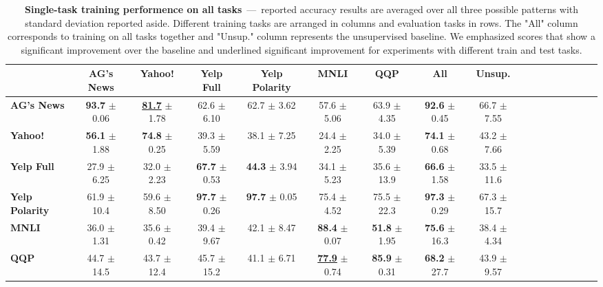 \begin{table*}[h]
	\centering
	\fontsize{9}{13}
	\selectfont
	\begin{tabular*}{\textwidth}{l@{\extracolsep{\fill}}cccccccccccccccc}
		\toprule
		& \textbf{AG's News}    & \textbf{Yahoo!}    & \textbf{Yelp Full}    & \textbf{Yelp Polarity}    & \textbf{MNLI}    & \textbf{QQP}    & \textbf{All}    & \textbf{Unsup.}    \\ \hline
		\textbf{AG's News}        & \textbf{93.7}   \tiny$\pm$ 0.06      & \textbf{\underline{81.7}}   \tiny$\pm$ 1.78      & 62.6      \tiny$\pm$ 6.10      & 62.7          \tiny$\pm$ 3.62      & 57.6 \tiny$\pm$ 5.06      & 63.9 \tiny$\pm$ 4.35      & \textbf{92.6} \tiny$\pm$ 0.45      & 66.7   \tiny$\pm$ 7.55      \\
		\textbf{Yahoo!}         & \textbf{56.1}    \tiny$\pm$ 1.88      & \textbf{74.8}   \tiny$\pm$ 0.25      & 39.3       \tiny$\pm$ 5.59      & 38.1           \tiny$\pm$ 7.25      & 24.4  \tiny$\pm$ 2.25      & 34.0 \tiny$\pm$ 5.39      & \textbf{74.1} \tiny$\pm$ 0.68      & 43.2   \tiny$\pm$ 7.66      \\
		\textbf{Yelp Full}     & 27.9    \tiny$\pm$ 6.25      & 32.0   \tiny$\pm$ 2.23      & \textbf{67.7}       \tiny$\pm$ 0.53      & \textbf{44.3}           \tiny$\pm$ 3.94      & 34.1  \tiny$\pm$ 5.23      & 35.6 \tiny$\pm$ 13.9      & \textbf{66.6} \tiny$\pm$ 1.58      & 33.5   \tiny$\pm$ 11.6      \\
		\textbf{Yelp Polarity} & 61.9    \tiny$\pm$ 10.4      & 59.6   \tiny$\pm$ 8.50      & \textbf{97.7}       \tiny$\pm$ 0.26      & \textbf{97.7}           \tiny$\pm$ 0.05      & 75.4  \tiny$\pm$ 4.52      & 75.5 \tiny$\pm$ 22.3      & \textbf{97.3} \tiny$\pm$ 0.29      & 67.3   \tiny$\pm$ 15.7      \\
		\textbf{MNLI}          & 36.0    \tiny$\pm$ 1.31      & 35.6   \tiny$\pm$ 0.42      & 39.4       \tiny$\pm$ 9.67      & 42.1           \tiny$\pm$ 8.47      & \textbf{88.4}  \tiny$\pm$ 0.07      & \textbf{51.8} \tiny$\pm$ 1.95      & \textbf{75.6} \tiny$\pm$ 16.3      & 38.4   \tiny$\pm$ 4.34      \\
		\textbf{QQP}           & 44.7    \tiny$\pm$ 14.5      & 43.7   \tiny$\pm$ 12.4      & 45.7       \tiny$\pm$ 15.2      & 41.1           \tiny$\pm$ 6.71      & \textbf{\underline{77.9}}  \tiny$\pm$ 0.74      & \textbf{85.9} \tiny$\pm$ 0.31      & \textbf{68.2} \tiny$\pm$ 27.7      & 43.9   \tiny$\pm$ 9.57      \\ \bottomrule
	\end{tabular*}
	\caption{\textbf{Single-task training performence on all tasks}~---~reported accuracy results are averaged over all three possible patterns with standard deviation reported aside. Different training tasks are arranged in columns and evaluation tasks in rows. The "All" column corresponds to training on all tasks together and "Unsup." column represents the unsupervised baseline. We emphasized scores that show a significant improvement over the baseline and underlined significant improvement for experiments with different train and test tasks.}\label{tab:single-on-train-set-summary}
	\vspace{-4mm}
\end{table*}
